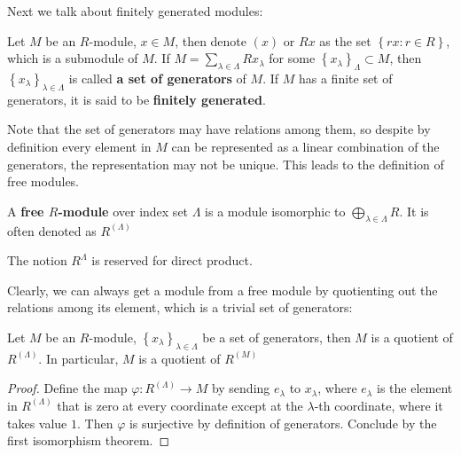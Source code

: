 \documentclass{note-eng}
\begin{document}
Next we talk about finitely generated modules:

\begin{definition} 
    Let $M$ be an $R$-module, $x \in M$, then denote $(x)$ or $Rx$ as the set $\left\lbrace rx: r \in R \right\rbrace$, which is a submodule of $M$. If $M = \sum\limits_{\lambda \in \Lambda} Rx_{\lambda}$ for some $\left\lbrace x_{\lambda} \right\rbrace_{\Lambda} \subset M$, then $\left\lbrace x_{\lambda} \right\rbrace_{\lambda \in \Lambda}$ is called \textbf{a set of generators} of $M$. If $M$ has a finite set of generators, it is said to be \textbf{finitely generated}.
\end{definition}

Note that the set of generators may have relations among them, so despite by definition every element in $M$ can be represented as a linear combination of the generators, the representation may not be unique. This leads to the definition of free modules.

\begin{definition}
    A \textbf{free $R$-module} over index set $\Lambda$ is a module isomorphic to $\bigoplus_{\lambda \in \Lambda} R$. It is often denoted as $R^{(\Lambda)}$
\end{definition}

\begin{remark}
    The notion $R^{\Lambda}$ is reserved for direct product.
\end{remark}

Clearly, we can always get a module from a free module by quotienting out the relations among its element, which is a trivial set of generators:

\begin{proposition}
    Let $M$ be an $R$-module, $\left\lbrace x_{\lambda} \right\rbrace_{\lambda \in \Lambda}$ be a set of generators, then $M$ is a quotient of $R^{(\Lambda)}$. In particular, $M$ is a quotient of $R^{(M)}$
\end{proposition}

\begin{proof}
    Define the map $\varphi: R^{(\Lambda)} \rightarrow M$ by sending $e_{\lambda}$ to $x_\lambda$, where $e_{\lambda}$ is the element in $R^{(\Lambda)}$ that is zero at every coordinate except at the $\lambda$-th coordinate, where it takes value $1$. Then $\varphi$ is surjective by definition of generators. Conclude by the first isomorphism theorem.
\end{proof}
\end{document}
